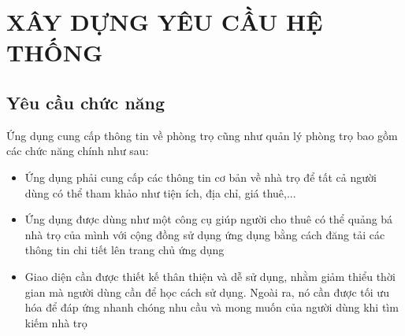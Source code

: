\section{XÂY DỰNG YÊU CẦU HỆ THỐNG}
\subsection{Yêu cầu chức năng}
Ứng dụng cung cấp thông tin về phòng trọ cũng như quản lý phòng trọ bao gồm các chức năng chính như sau: 
\begin{itemize}
    \item Ứng dụng phải cung cấp các thông tin cơ bản về nhà trọ để tất cả người dùng có thể tham khảo như tiện ích, địa chỉ, giá thuê,...
    \item Ứng dụng được dùng như một công cụ giúp người cho thuê có thể quảng bá nhà trọ của mình với cộng đồng sử dụng ứng dụng bằng cách đăng tải các thông tin chi tiết lên trang chủ ứng dụng
    \item Giao diện cần được thiết kế thân thiện và dễ sử dụng, nhằm giảm thiểu thời gian mà người dùng cần để học cách sử dụng. Ngoài ra, nó cần được tối ưu hóa để đáp ứng nhanh chóng nhu cầu và mong muốn của người dùng khi tìm kiếm nhà trọ
\end{itemize}
